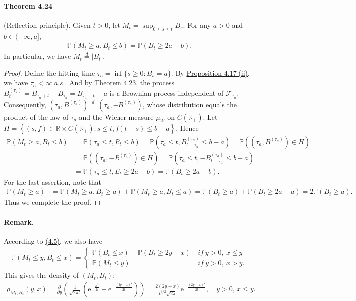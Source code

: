 \documentclass{article}
\numberwithin{equation}{section}
\newcommand{\e}{\mathrm{e}}
\renewcommand{\P}{\mathbb{P}}
\theoremstyle{plain}
\theoremstyle{definition}
\begin{document}
\paragraph{Theorem 4.24\label{thm:4.24}} (Reflection principle). Given $t>0$, let $M_t=\sup_{0\leq s\leq t}B_s$. For any $a>0$ and $b\in(-\infty,a]$,
\begin{align*}
	\P(M_t\geq a,B_t\leq b)=\P(B_t\geq 2a-b).\tag{4.5}\label{eq:4.5}
\end{align*}
In particular, we have $M_t\overset{d}{=}\vert B_t\vert$.
\begin{proof}
Define the hitting time $\tau_a=\inf\{s\geq 0:B_s=a\}$. By \hyperref[prop:4.17]{Proposition 4.17 (ii)}, we have $\tau_a<\infty\ a.s.$. And by \hyperref[thm:4.23]{Theorem 4.23}, the process $B_t^{(\tau_a)}=B_{\tau_a+t}-B_{\tau_a}=B_{\tau_a+t}-a$ is a Brownian process independent of $\mathscr{F}_{\tau_a}$. Consequently, $(\tau_a,B^{(\tau_a)})\overset{d}{=}(\tau_a,-B^{(\tau_a)})$, whose distribution equals the product of the law of $\tau_a$ and the Wiener measure $\mu_W$ on $C(\mathbb{R}_+)$. Let $H=\left\{(s,f)\in\mathbb{R}\times C(\mathbb{R}_+):s\leq t, f(t-s)\leq b-a\right\}$. Hence
\begin{align*}
	\P\left(M_t\geq a,B_t\leq b\right)&=\P\left(\tau_a\leq t,B_t\leq b\right)=\P\left(\tau_a\leq t,B_{t-\tau_a}^{(\tau_a)}\leq b-a\right)=\P\left((\tau_a,B^{(\tau_a)})\in H\right)\\
	&=\P\left((\tau_a,-B^{(\tau_a)})\in H\right)=\P(\tau_a\leq t,-B_{t-\tau_a}^{(\tau_a)}\leq b-a)\\
	&= \P(\tau_a\leq t,B_t\geq 2a-b) = \P(B_t\geq 2a-b).
\end{align*}
For the last assertion, note that
\begin{align*}
	\P(M_t\geq a)&=\P(M_t\geq a, B_t\geq a) + \P(M_t\geq a, B_t\leq a)
	=\P(B_t\geq a) + \P(B_t\geq 2a-a) = 2\P(B_t\geq a).
\end{align*}
Thus we complete the proof.
\end{proof}

\paragraph{Remark.} According to \hyperref[eq:4.5]{(4.5)}, we also have
\begin{align*}
	\P(M_t\leq y,B_t\leq x)=\begin{cases}
		\P(B_t\leq x)-\P(B_t\geq 2y-x)\ &\textit{if}\ y>0,\ x\leq y\\
		\P(M_t\leq y) &\textit{if}\ y>0,\ x>y.
	\end{cases}
\end{align*}
This gives the density of $(M_t,B_t)$:
\begin{align*}
	\rho_{M_t,B_t}(y,x)=\frac{\partial}{\partial y}\left(\frac{1}{\sqrt{2\pi t}}\left(\e^{-\frac{x^2}{2t}}+\e^{-\frac{(2y-x)^2}{2t}}\right)\right) = \frac{2(2y-x)}{t^{3/2}\sqrt{2\pi}}\e^{-\frac{(2y-x)^2}{2t}},\quad y>0,\ x\leq y.
\end{align*}
\end{document}
